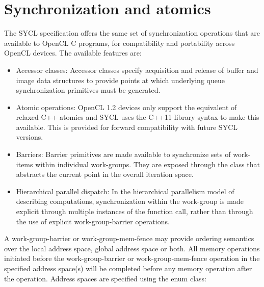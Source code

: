 \section{Synchronization and atomics}


The SYCL specification offers the same set of synchronization
operations that are available to OpenCL C programs, for compatibility
and portability across OpenCL devices. The available features are:
\begin{itemize}
  \item
    Accessor classes: Accessor classes specify acquisition and release
    of buffer and image data structures to provide points at which
    underlying queue synchronization primitives must be generated.
  \item
    Atomic operations: OpenCL 1.2 devices only support the equivalent
    of relaxed C++ atomics and SYCL uses the C++11 library syntax to
    make this available. This is provided for forward compatibility
    with future SYCL versions.
  \item
    Barriers: Barrier primitives are made available to synchronize
    sets of work-items within individual work-groups. They are exposed
    through the  class that abstracts the current
    point in the overall iteration space.
  \item
    Hierarchical parallel dispatch: In the hierarchical parallelism
    model of describing computations, synchronization within the
    work-group is made explicit through multiple instances of the
     function call, rather than
    through the use of explicit \gls{work-group-barrier} operations.
\end{itemize}

A \gls{work-group-barrier} or \gls{work-group-mem-fence} may provide ordering semantics over the local address space, global address space or both. All memory operations initiated before the \gls{work-group-barrier} or \gls{work-group-mem-fence} operation in the specified address space(s) will be completed before any memory operation after the operation. Address spaces are specified using the  enum class:



